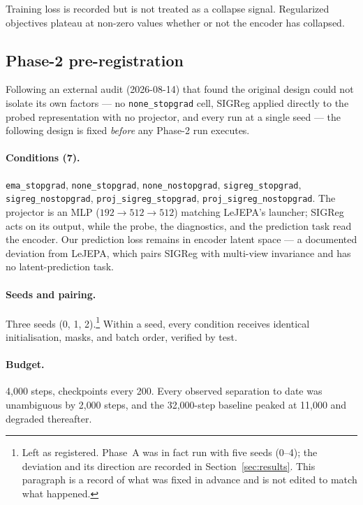 Training loss is recorded but is not treated as a collapse signal. Regularized objectives
plateau at non-zero values whether or not the encoder has collapsed.

\subsection{Phase-2 pre-registration}
\label{sec:prereg}

Following an external audit (2026-08-14) that found the original design could not isolate
its own factors — no \texttt{none\_stopgrad} cell, SIGReg applied directly to the probed
representation with no projector, and every run at a single seed — the following design is
fixed \emph{before} any Phase-2 run executes.

\paragraph{Conditions (7).} \texttt{ema\_stopgrad}, \texttt{none\_stopgrad},
\texttt{none\_nostopgrad}, \texttt{sigreg\_stopgrad}, \texttt{sigreg\_nostopgrad},
\texttt{proj\_sigreg\_stopgrad}, \texttt{proj\_sigreg\_nostopgrad}. The projector is an
MLP ($192 \to 512 \to 512$) matching LeJEPA's launcher; SIGReg acts on its output, while
the probe, the diagnostics, and the prediction task read the encoder. Our prediction loss
remains in encoder latent space — a documented deviation from LeJEPA, which pairs SIGReg
with multi-view invariance and has no latent-prediction task.

\paragraph{Seeds and pairing.} Three seeds (0, 1, 2).\footnote{Left as registered. Phase~A
was in fact run with five seeds (0--4); the deviation and its direction are recorded in
Section~\ref{sec:results}. This paragraph is a record of what was fixed in advance and is
not edited to match what happened.} Within a seed, every condition
receives identical initialisation, masks, and batch order, verified by test.

\paragraph{Budget.} 4{,}000 steps, checkpoints every 200. Every observed separation to
date was unambiguous by 2{,}000 steps, and the 32{,}000-step baseline peaked at 11{,}000
and degraded thereafter.

